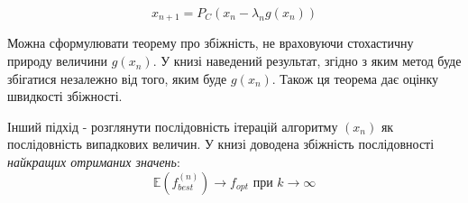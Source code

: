\documentclass[main.tex]{subfile}
\begin{document}
    \[ x_{n+1} = P_C(x_n - \lambda_n g(x_n)) \]
    
    
    Можна сформулювати теорему про збіжність, не враховуючи стохастичну природу величини $g(x_n)$. У книзі \cite{amir_beck} наведений результат, згідно з яким метод буде збігатися незалежно від того, яким буде $g(x_n)$. Також ця теорема дає оцінку швидкості збіжності.
    
    Інший підхід - розглянути послідовність ітерацій алгоритму $(x_n)$ як послідовність випадкових величин. У книзі \cite{amir_beck} доводена збіжність послідовності {\itshape найкращих отриманих значень}:
    \[ \mathbb{E}(f_{best}^{(n)}) \rightarrow f_{opt} \text{ при } k \rightarrow \infty\]
    
\end{document}
